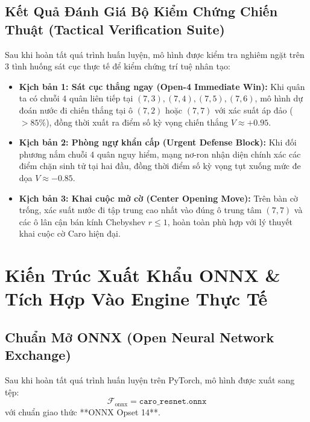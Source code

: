\documentclass[11pt,a4paper]{report}
\begin{document}
\section{Kết Quả Đánh Giá Bộ Kiểm Chứng Chiến Thuật (Tactical Verification Suite)}

Sau khi hoàn tất quá trình huấn luyện, mô hình được kiểm tra nghiêm ngặt trên 3 tình huống sát cục thực tế để kiểm chứng trí tuệ nhân tạo:
\begin{itemize}
    \item \textbf{Kịch bản 1: Sát cục thắng ngay (Open-4 Immediate Win):}
    Khi quân ta có chuỗi 4 quân liên tiếp tại $(7, 3), (7, 4), (7, 5), (7, 6)$, mô hình dự đoán nước đi chiến thắng tại ô $(7, 2)$ hoặc $(7, 7)$ với xác suất áp đảo ($> 85\%$), đồng thời xuất ra điểm số kỳ vọng chiến thắng $V \approx +0.95$.
    \item \textbf{Kịch bản 2: Phòng ngự khẩn cấp (Urgent Defense Block):}
    Khi đối phương nắm chuỗi 4 quân nguy hiểm, mạng nơ-ron nhận diện chính xác các điểm chặn sinh tử tại hai đầu, đồng thời điểm số kỳ vọng tụt xuống mức đe dọa $V \approx -0.85$.
    \item \textbf{Kịch bản 3: Khai cuộc mở cờ (Center Opening Move):}
    Trên bàn cờ trống, xác suất nước đi tập trung cao nhất vào đúng ô trung tâm $(7, 7)$ và các ô lân cận bán kính Chebyshev $r \le 1$, hoàn toàn phù hợp với lý thuyết khai cuộc cờ Caro hiện đại.
\end{itemize}

\chapter{Kiến Trúc Xuất Khẩu ONNX \& Tích Hợp Vào Engine Thực Tế}

\section{Chuẩn Mở ONNX (Open Neural Network Exchange)}

Sau khi hoàn tất quá trình huấn luyện trên PyTorch, mô hình được xuất sang tệp:
\begin{equation}
    \mathcal{F}_{\text{onnx}} = \texttt{caro\_resnet.onnx}
\end{equation}
với chuẩn giao thức **ONNX Opset 14**.
\end{document}
